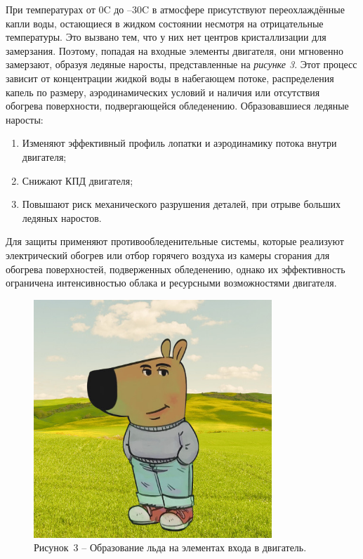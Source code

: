 При температурах от 0\textdegree{}C до –30\textdegree{}C 
в атмосфере присутствуют переохлаждённые капли воды, остающиеся в жидком состоянии несмотря на отрицательные температуры. Это вызвано тем, что у них нет центров кристаллизации для замерзания. Поэтому, попадая на входные элементы двигателя, они мгновенно замерзают, образуя ледяные наросты, представленные на \textit{рисунке 3}. Этот процесс зависит от концентрации жидкой воды в набегающем потоке, распределения капель по размеру, аэродинамических условий и наличия или отсутствия обогрева поверхности, подвергающейся обледенению. Образовавшиеся ледяные наросты:
\begin{enumerate}[label=\arabic*)\hspace{1em}, leftmargin=2cm, itemsep=0em]
	\item Изменяют эффективный профиль лопатки и аэродинамику потока внутри двигателя;
	\item Снижают КПД двигателя;
	\item Повышают риск механического разрушения деталей, при отрыве больших ледяных наростов.
\end{enumerate}

Для защиты применяют противообледенительные системы, которые реализуют электрический обогрев или отбор горячего воздуха из камеры сгорания для обогрева поверхностей, подверженных обледенению, однако их эффективность ограничена интенсивностью облака и ресурсными возможностями двигателя.
\begin{figure}[H]
	\centering
	\includegraphics[width=0.8\textwidth]{figures/chill-guy.jpeg}
	\caption*{Рисунок~3 – Образование льда на элементах входа в двигатель.}
	\label{fig:-1}
\end{figure}

